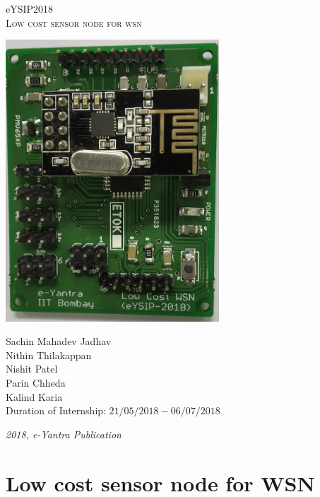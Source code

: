 \documentclass[a4paper,12pt,oneside]{book}
\begin{document}
\begin{titlepage}
\raggedright
{\Large eYSIP2018\\[1cm]}
{\Huge\scshape Low cost sensor node for wsn  \\[.1in]}
\vfill
\begin{center}
 \includegraphics[width=0.6\textwidth]{node_Printed_board.PNG}
 \end{center}
\begin{flushright}
{\large Sachin Mahadev Jadhav \\}
{\large Nithin Thilakappan \\}
{\large Nishit Patel \\}
{\large  Parin Chheda \\}
{\large  Kalind Karia \\}
{\large Duration of Internship: $ 21/05/2018-06/07/2018 $ \\}
\end{flushright}

{\itshape 2018, e-Yantra Publication}
\end{titlepage}

\chapter[Project Tag]{Low cost sensor node for WSN}
\end{document}
